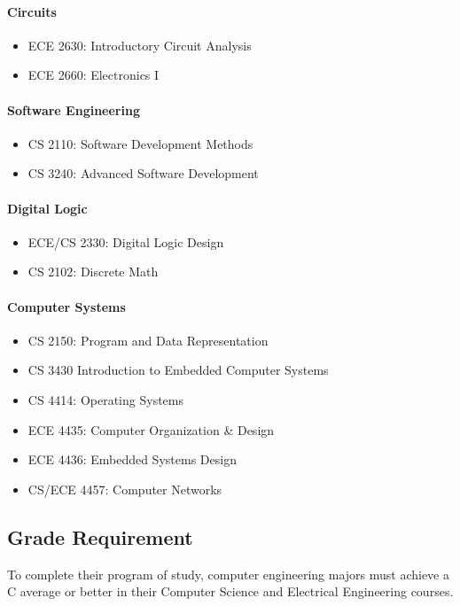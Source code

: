 \documentclass[10pt,letter]{book}
\newenvironment{itemlist}{
\begin{itemize}
\setlength{\itemsep}{0pt}
\setlength{\parskip}{0pt}}
{\end{itemize}}
\begin{document}
\paragraph{Circuits}
\begin{itemlist}
\item ECE 2630: Introductory Circuit Analysis
\item ECE 2660: Electronics I
\end{itemlist}

\paragraph{Software Engineering}
\begin{itemlist}
\item CS 2110: Software Development Methods
\item CS 3240: Advanced Software Development
\end{itemlist}

\paragraph{Digital Logic}
\begin{itemlist}
\item ECE/CS 2330: Digital Logic Design
\item CS 2102: Discrete Math
\end{itemlist}

\paragraph{Computer Systems}
\begin{itemlist}
\item CS 2150: Program and Data Representation
\item CS 3430 Introduction to Embedded Computer Systems
\item CS 4414: Operating Systems
\item ECE 4435: Computer Organization \& Design
\item ECE 4436: Embedded Systems Design
\item CS/ECE 4457: Computer Networks
\end{itemlist}

\subsection{Grade Requirement}
To complete their program of study, computer engineering majors must
achieve a C average or better in their Computer Science and Electrical
Engineering courses.
\end{document}
